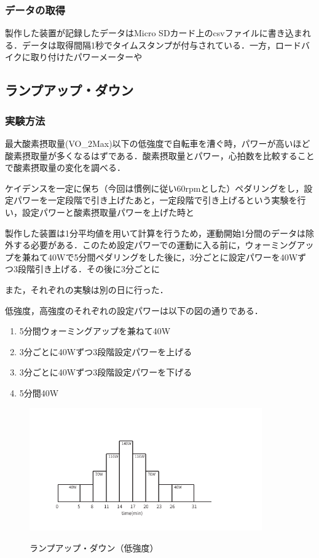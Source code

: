\subsubsection{データの取得}

製作した装置が記録したデータはMicro SDカード上のcsvファイルに書き込まれる．データは取得間隔1秒でタイムスタンプが付与されている．一方，ロードバイクに取り付けたパワーメーターや

\subsection{ランプアップ・ダウン}

\subsubsection{実験方法}

最大酸素摂取量(VO_2Max)以下の低強度で自転車を漕ぐ時，パワーが高いほど酸素摂取量が多くなるはずである．酸素摂取量とパワー，心拍数を比較することで酸素摂取量の変化を調べる．

ケイデンスを一定に保ち（今回は慣例に従い60rpmとした）ペダリングをし，設定パワーを一定段階で引き上げたあと，一定段階で引き上げるという実験を行い，設定パワーと酸素摂取量パワーを上げた時と

製作した装置は1分平均値を用いて計算を行うため，運動開始1分間のデータは除外する必要がある．このため設定パワーでの運動に入る前に，ウォーミングアップを兼ねて40Wで5分間ペダリングをした後に，3分ごとに設定パワーを40Wずつ3段階引き上げる．その後に3分ごとに

また，それぞれの実験は別の日に行った．

低強度，高強度のそれぞれの設定パワーは以下の図の通りである．

\begin{enumerate}
  \item 5分間ウォーミングアップを兼ねて40W
  \item 3分ごとに40Wずつ3段階設定パワーを上げる
  \item 3分ごとに40Wずつ3段階設定パワーを下げる
  \item 5分間40W
\end{enumerate}

\begin{figure}[h]
  \begin{center}
    \label{fig:protocol_rampup_light}
    \includegraphics[width=10cm]{fig/protocol_rampup_light.pdf}
    \caption{ランプアップ・ダウン（低強度）}
  \end{center}
\end{figure}

